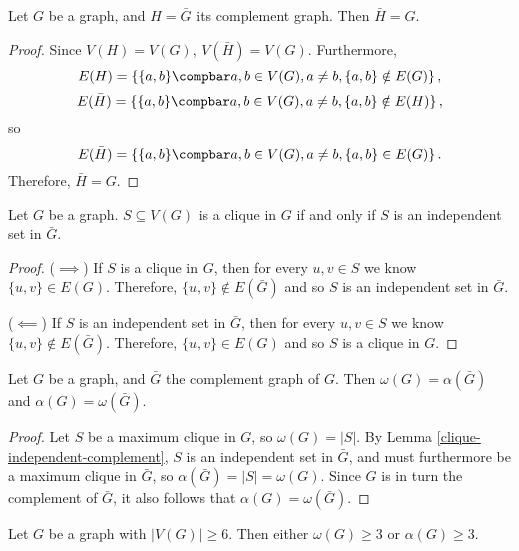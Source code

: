 \documentclass[12pt]{article}
\begin{document}
\begin{prop}
    Let $G$ be a graph, and $H = \bar{G}$ its complement graph. Then $\bar{H} = G$.
\end{prop}

\begin{proof}
    Since $V(H) = V(G)$, $V(\bar{H}) = V(G)$. Furthermore,
    \[E(H) = \left\{\{a, b\} \compbar a, b \in V(G), a \neq b, \{a, b\} \notin E(G) \right\},\] \[E(\bar{H}) = \left\{\{a, b\} \compbar a, b \in V(G), a \neq b, \{a, b\} \notin E(H) \right\},\] so \[E(\bar{H}) = \left\{\{a, b\} \compbar a, b \in V(G), a \neq b, \{a, b\} \in E(G) \right\}.\] Therefore, $\bar{H} = G$.
\end{proof}

\begin{lemma}\label{clique-independent-complement}
    Let $G$ be a graph. $S \subseteq V(G)$ is a clique in $G$ if and only if $S$ is an independent set in $\bar{G}$.
\end{lemma}

\begin{proof}\proofbreak
    ($\implies$) If $S$ is a clique in $G$, then for every $u, v \in S$ we know $\{u, v\} \in E(G)$. Therefore, $\{u, v\} \notin E(\bar{G})$ and so $S$ is an independent set in $\bar{G}$.

    ($\impliedby$) If $S$ is an independent set in $\bar{G}$, then for every $u, v \in S$ we know $\{u, v\} \notin E(\bar{G})$. Therefore, $\{u, v\} \in E(G)$ and so $S$ is a clique in $G$.
\end{proof}

\begin{thm}
    Let $G$ be a graph, and $\bar{G}$ the complement graph of $G$. Then $\omega(G) = \alpha(\bar{G})$ and $\alpha(G) = \omega(\bar{G})$.
\end{thm}

\begin{proof}
    Let $S$ be a maximum clique in $G$, so $\omega(G) = |S|$. By Lemma \ref{clique-independent-complement}, $S$ is an independent set in $\bar{G}$, and must furthermore be a maximum clique in $\bar{G}$, so $\alpha(\bar{G}) = |S| = \omega(G)$. Since $G$ is in turn the complement of $\bar{G}$, it also follows that $\alpha(G) = \omega(\bar{G})$.
\end{proof}

\begin{thm}
    Let $G$ be a graph with $|V(G)| \geq 6$. Then either $\omega(G) \geq 3$ or $\alpha(G) \geq 3$.
\end{thm}
\end{document}
